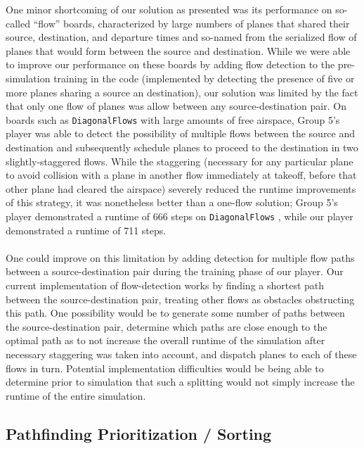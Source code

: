 \documentclass[10pt]{article}
\newcommand{\ms}[1] {
  \texttt{#1}
}
\begin{document}
One minor shortcoming of our solution as presented was its performance 
on so-called ``flow'' boards, characterized by large numbers  of planes that shared 
their source, destination, and departure times and so-named from the serialized 
flow of planes that would form between the source and destination.  While we
were able to improve our performance on these boards by adding flow detection
to the pre-simulation training in the code (implemented by detecting the presence
of five or more planes sharing a source an destination), our solution was limited
by the fact that only one flow of planes was allow between any source-destination
pair. On boards such as \ms{DiagonalFlows} with large amounts of free airspace, Group 5's
player was able to detect the possibility of multiple flows between the source and destination
and subsequently schedule planes to proceed to the destination in two slightly-staggered
flows. While the staggering (necessary for any particular plane to avoid collision with
a plane in another flow immediately at takeoff, before that other plane had cleared the 
airspace) severely reduced the runtime improvements of this strategy, it was nonetheless
better than a one-flow solution; Group 5's player demonstrated a runtime of 666 steps
on \ms{DiagonalFlows}, while our player demonstrated a runtime of 711 steps.\\\\
One could improve on this limitation by adding detection for multiple flow paths between
a source-destination pair during the training phase of our player. Our current implementation
of flow-detection works by finding a shortest path between the source-destination pair, treating
other flows as obstacles obstructing this path. One possibility would be to generate some number
of paths between the source-destination pair, determine which paths are close enough to the
optimal path as to not increase the overall runtime of the simulation after necessary 
staggering was taken into account, and dispatch planes to each of these flows in turn.
Potential implementation difficulties would be being able to determine prior to simulation
that such a splitting would not simply increase the runtime of the entire simulation.

\subsection{Pathfinding Prioritization / Sorting}
\end{document}
